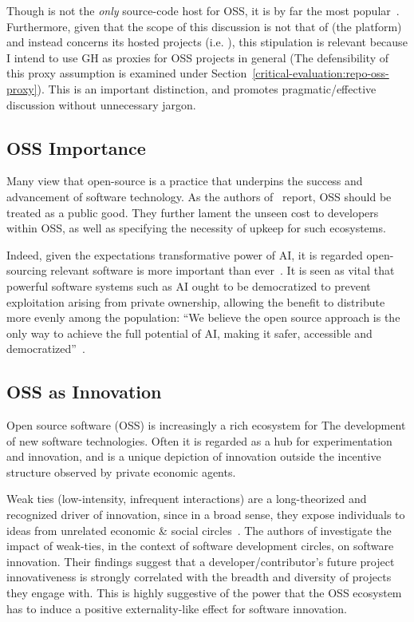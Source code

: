 Though \gh{} is not the \emph{only} source-code host for OSS, it is by far the most popular~\cite{_2025_GitHub}.
Furthermore, given that the scope of this discussion is not that of \gh{} (the platform) and instead concerns its hosted projects (i.e. \repos{}), this stipulation is relevant because I intend to use GH \repos{} as proxies for OSS projects in general (The defensibility of this proxy assumption is examined under Section~\ref{critical-evaluation:repo-oss-proxy}).
This is an important distinction, and promotes pragmatic/effective discussion without unnecessary jargon.

\subsection{OSS Importance}
Many view that open-source is a practice that underpins the success and advancement of software technology. As the authors of~\cite{_2016_RoadsBridges} report, OSS should be treated as a public good. They further lament the unseen cost to developers within OSS, as well as specifying the necessity of upkeep for such ecosystems.

Indeed, given the expectations transformative power of AI, it is regarded open-sourcing relevant software is more important than ever~\cite{__WhyOpen, _2025_OpenSource}.
It is seen as vital that powerful software systems such as AI ought to be democratized to prevent exploitation arising from private ownership, allowing the benefit to distribute more evenly among the population: ``We believe the open source approach is the only way to achieve the full potential of AI, making it safer, accessible and democratized''~\cite{__WhyOpen}.

\subsection{OSS as Innovation}

Open source software (OSS) is increasingly a rich ecosystem for The development of new software technologies.
Often it is regarded as a hub for experimentation and innovation, and is a unique depiction of innovation outside the incentive structure observed by private economic agents.

Weak ties (low-intensity, infrequent interactions) are a long-theorized and recognized driver of innovation, since in a broad sense, they expose individuals to ideas from unrelated economic \& social circles~\cite{wei_2023_MetaTheories}.
The authors of \cite{fang_2024_WeakTies} investigate the impact of weak-ties, in the context of software development circles, on software innovation. Their findings suggest that a developer/contributor's future project innovativeness is strongly correlated with the breadth and diversity of projects they engage with.
This is highly suggestive of the power that the OSS ecosystem has to induce a positive externality-like effect for software innovation.

